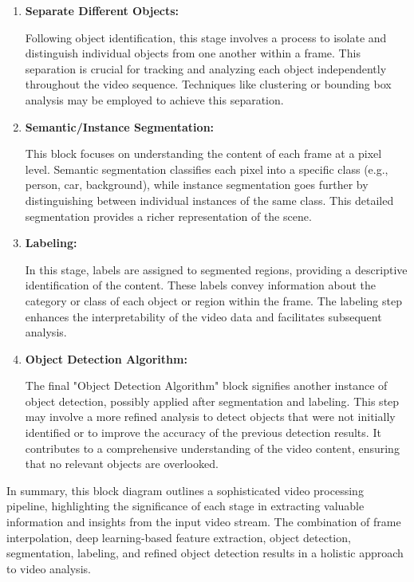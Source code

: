 \begin{enumerate}
     \item\textbf{Separate Different Objects:}

     Following object identification, this stage involves a process to isolate and distinguish individual objects from one another within a frame. This separation is crucial for tracking and analyzing each object independently throughout the video sequence. Techniques like clustering or bounding box analysis may be employed to achieve this separation.

     \clearpage
     
     \item\textbf{Semantic/Instance Segmentation:}

     This block focuses on understanding the content of each frame at a pixel level. Semantic segmentation classifies each pixel into a specific class (e.g., person, car, background), while instance segmentation goes further by distinguishing between individual instances of the same class. This detailed segmentation provides a richer representation of the scene.
     
     \item\textbf{Labeling:}

     In this stage, labels are assigned to segmented regions, providing a descriptive identification of the content. These labels convey information about the category or class of each object or region within the frame. The labeling step enhances the interpretability of the video data and facilitates subsequent analysis.
     
     \item\textbf{Object Detection Algorithm:}

     The final "Object Detection Algorithm" block signifies another instance of object detection, possibly applied after segmentation and labeling. This step may involve a more refined analysis to detect objects that were not initially identified or to improve the accuracy of the previous detection results. It contributes to a comprehensive understanding of the video content, ensuring that no relevant objects are overlooked.  
    
\end{enumerate}

\noindent In summary, this block diagram outlines a sophisticated video processing pipeline, highlighting the significance of each stage in extracting valuable information and insights from the input video stream. The combination of frame interpolation, deep learning-based feature extraction, object detection, segmentation, labeling, and refined object detection results in a holistic approach to video analysis.

